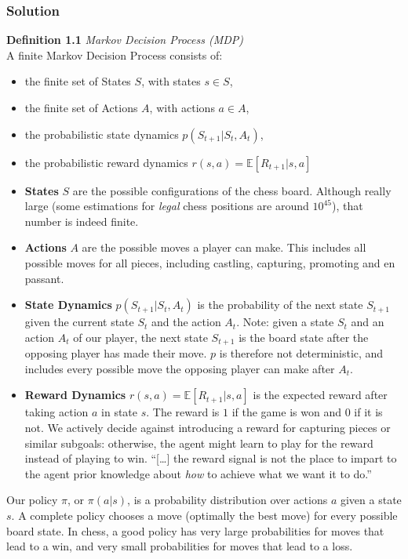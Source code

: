 \documentclass{article}
\begin{document}
\subsubsection{Solution}
\begin{tcolorbox}[colback=LightGray]
    \textbf{Definition 1.1} \textit{Markov Decision Process (MDP)} \\
    A finite Markov Decision Process consists of:
    \begin{itemize}
        \item the finite set of States $S$, with states $s \in S$,
        \item the finite set of Actions $A$, with actions $a \in A$,
        \item the probabilistic state dynamics $p(S_{t+1} | S_t, A_t)$,
        \item the probabilistic reward dynamics $r(s, a) = \mathbb{E}[R_{t+1} | s, a]$
    \end{itemize}
\end{tcolorbox}
\begin{itemize}
    \item \textbf{States} $S$ are the possible configurations of the chess board.
    Although really large (some estimations for \emph{legal} chess positions are around $10^{45}$),
    that number is indeed finite.
    \item \textbf{Actions} $A$ are the possible moves a player can make. This includes
    all possible moves for all pieces, including castling, capturing, promoting and en passant.
    \item \textbf{State Dynamics} $p(S_{t+1} | S_t, A_t)$ is the probability of the next state
    $S_{t+1}$ given the current state $S_t$ and the action $A_t$. Note: given a 
    state $S_t$ and an action $A_t$ of our player, the next state $S_{t+1}$ is the board state
    after the opposing player has made their move. $p$ is therefore not deterministic, and includes
    every possible move the opposing player can make after $A_t$.
    \item \textbf{Reward Dynamics} $r(s, a) = \mathbb{E}[R_{t+1} | s, a]$ is the expected reward
    after taking action $a$ in state $s$. The reward is $1$ if the game is won and $0$ if it is not. 
    We actively decide against introducing a reward for capturing pieces or similar subgoals: otherwise, 
    the agent might learn to play for the reward instead of playing to win. ``[\dots] the reward signal is 
    not the place to impart to the agent prior knowledge about \emph{how} to achieve what we want it to do.''\cite{sutton_bach_barto_2018}
\end{itemize}
Our policy $\pi$, or $\pi(a|s)$, is a probability distribution over actions $a$ given a state $s$.
A complete policy chooses a move (optimally the best move) for every possible board state.
In chess, a good policy has very large probabilities for moves that lead to a win, and very small
probabilities for moves that lead to a loss. 
\end{document}

